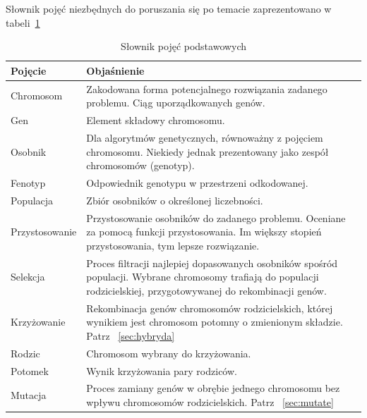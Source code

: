 \documentclass[twoside,a4paper,10]{book}
\begin{document}
Słownik pojęć niezbędnych do poruszania się po temacie zaprezentowano w tabeli~\ref{table:dicTab} \begin{table}
\renewcommand\arraystretch{1.5}
 \centering
    \begin{tabular}{|>{\centering\arraybackslash}m{4cm}|m{8.5cm}|}
     \hline
    \textbf{Pojęcie} & \textbf{Objaśnienie}\\ \hline
     Chromosom& Zakodowana forma potencjalnego rozwiązania zadanego problemu. Ciąg uporządkowanych genów.\\ \hline 
     Gen & Element składowy chromosomu.  \\ \hline
    Osobnik & Dla algorytmów genetycznych, równoważny z pojęciem chromosomu. Niekiedy jednak prezentowany jako zespół chromosomów (genotyp).\\ \hline
     Fenotyp& Odpowiednik genotypu w przestrzeni odkodowanej. \\ \hline
     Populacja& Zbiór osobników o określonej liczebności.\\ \hline
     Przystosowanie& Przystosowanie osobników do zadanego problemu. Oceniane za pomocą funkcji przystosowania. Im większy stopień przystosowania, tym lepsze rozwiązanie. \\ \hline
     Selekcja & Proces filtracji najlepiej dopasowanych osobników spośród populacji. Wybrane chromosomy trafiają do populacji rodzicielskiej, przygotowywanej do rekombinacji genów.\\ \hline
     Krzyżowanie &  Rekombinacja genów chromosomów rodzicielskich, której wynikiem jest chromosom potomny o zmienionym składzie. Patrz ~\ref{sec:hybryda}  \\ \hline 
    Rodzic & Chromosom wybrany do krzyżowania. \\ \hline
    Potomek & Wynik krzyżowania pary rodziców. \\ \hline
    Mutacja & Proces zamiany genów w obrębie jednego chromosomu bez wpływu chromosomów rodzicielskich. Patrz ~\ref{sec:mutate}\\ \hline
	\end{tabular}
	 \caption{Słownik pojęć podstawowych} 
    \label{table:dicTab}
\end{table}
\end{document}

